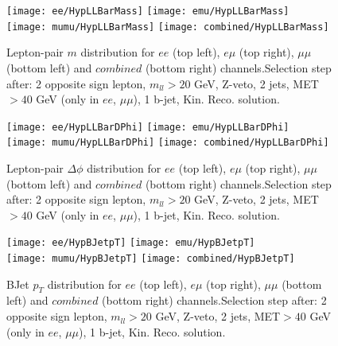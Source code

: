 \documentclass[12pt, a4paper, titlepage]{article}
\begin{document}
\clearpage
\newpage


\begin{figure}
  \texttt{[image: ee/HypLLBarMass]}
  \texttt{[image: emu/HypLLBarMass]}\\
  \texttt{[image: mumu/HypLLBarMass]}
  \texttt{[image: combined/HypLLBarMass]}
\caption{Lepton-pair $m$ distribution for $ee$ (top left), $e\mu$ (top right), $\mu\mu$ (bottom left) and $combined$ (bottom right) channels.\newline Selection step after: 2 opposite sign lepton, $m_{ll}>20$ GeV, Z-veto, 2 jets, MET$>40$ GeV (only in $ee$, $\mu\mu$), 1 b-jet, Kin. Reco. solution.}
\end{figure}

\clearpage
\newpage

\begin{figure}
  \texttt{[image: ee/HypLLBarDPhi]}
  \texttt{[image: emu/HypLLBarDPhi]}\\
  \texttt{[image: mumu/HypLLBarDPhi]}
  \texttt{[image: combined/HypLLBarDPhi]}
\caption{Lepton-pair $\Delta\phi$ distribution for $ee$ (top left), $e\mu$ (top right), $\mu\mu$ (bottom left) and $combined$ (bottom right) channels.\newline Selection step after: 2 opposite sign lepton, $m_{ll}>20$ GeV, Z-veto, 2 jets, MET$>40$ GeV (only in $ee$, $\mu\mu$), 1 b-jet, Kin. Reco. solution.}
\end{figure}

\clearpage
\newpage


\begin{figure}
  \texttt{[image: ee/HypBJetpT]}
  \texttt{[image: emu/HypBJetpT]}\\
  \texttt{[image: mumu/HypBJetpT]}
  \texttt{[image: combined/HypBJetpT]}
\caption{BJet $p_T$ distribution for $ee$ (top left), $e\mu$ (top right), $\mu\mu$ (bottom left) and $combined$ (bottom right) channels.\newline Selection step after: 2 opposite sign lepton, $m_{ll}>20$ GeV, Z-veto, 2 jets, MET$>40$ GeV (only in $ee$, $\mu\mu$), 1 b-jet, Kin. Reco. solution.}
\end{figure}
\end{document}
